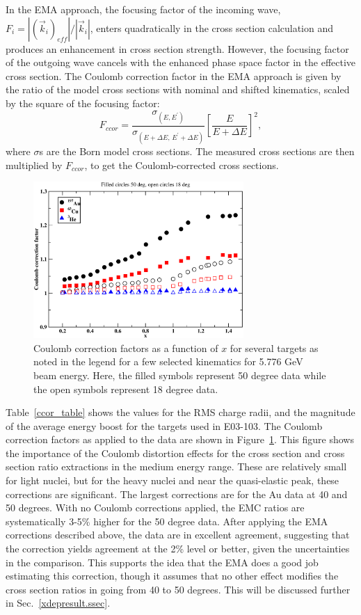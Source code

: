 In the EMA approach, the focusing factor of the incoming wave,
$F_{i}=|(\vec{k}_{i})_{eff}|/|\vec{k}_{i}|$, enters quadratically in the cross
section calculation and produces an enhancement in cross section strength.
However, the focusing factor of the outgoing wave cancels with the enhanced
phase space factor in the effective cross section. The Coulomb correction
factor in the EMA approach is given by the ratio of the model cross sections
with nominal and shifted kinematics, scaled by the square of the focusing
factor:
%
\begin{equation}
\label{ccor4_eqn}
F_{ccor} =\frac{\sigma_{(E,E^\prime)} }{\sigma_{(E+\Delta E,\, E^\prime+\Delta
E)}}{\left[\frac{E}{ E+\Delta E}\right]}^2,
\end{equation} 
%
where $\sigma$s are the Born model cross sections. The measured cross sections
are then multiplied by $F_{ccor}$, to get the Coulomb-corrected cross sections.

\begin{figure}[htbp]
\begin{center}
\includegraphics[width=80mm, angle=0]{plots/ccor_fac_paper.eps}
\caption{Coulomb correction factors as a function of $x$ for several
targets as noted in the legend for a few selected kinematics for 5.776 GeV
beam energy. Here, the filled symbols represent 50 degree data while the open
symbols represent 18 degree data.}
\label{ccor_fac_fig}
\end{center}
\end{figure}

Table~\ref{ccor_table} shows the values for the RMS charge radii, and the
magnitude of the average energy boost for the targets used in E03-103. The
Coulomb correction factors as applied to the data are shown in
Figure~\ref{ccor_fac_fig}. This figure shows the importance of the Coulomb
distortion effects for the cross section and cross section ratio extractions
in the medium energy range. These are relatively small for light nuclei, but
for the heavy nuclei and near the quasi-elastic peak, these corrections are
significant. The largest corrections are for the Au data at 40 and 50 degrees.
With no Coulomb corrections applied, the EMC ratios are systematically 3-5\%
higher for the 50 degree data.  After applying the EMA corrections described
above, the data are in excellent agreement, suggesting that the correction
yields agreement at the 2\% level or better, given the uncertainties in the
comparison.  This supports the idea that the EMA does a good job estimating
this correction, though it assumes that no other effect modifies the cross
section ratios in going from 40 to 50 degrees.  This will be discussed further
in Sec.~\ref{xdepresult.ssec}.

